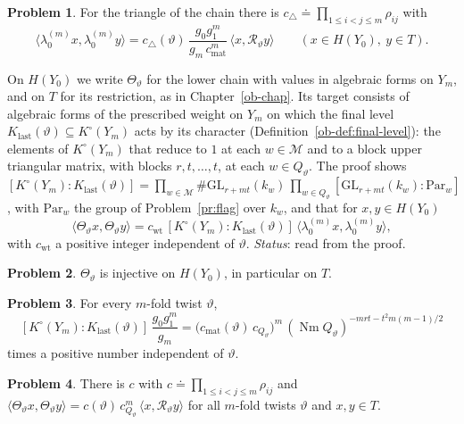 \documentclass[reqno]{amsart}
\newcounter{chap}
\theoremstyle{definition}
\newtheorem{problem}{Problem}[section]
\theoremstyle{plain}
\newcommand{\Nm}{\operatorname{Nm}}
\newcommand{\Rc}{\mathcal R}
\newcommand{\cM}{\mathcal M}
\newcommand{\GL}{\mathrm{GL}}
\newcommand{\cmat}{c_{\mathrm{mat}}}
\newcommand{\cwt}{c_{\mathrm{wt}}}
\newcommand{\Klast}{K_{\mathrm{last}}}
\begin{document}
\begin{problem}\label{pr:chain-row}
For the triangle of the chain there is \(c_\triangle \doteq \prod_{1 \le i < j \le m}\rho_{ij}\) with
\[
  \langle \lambda_0^{(m)}x, \lambda_0^{(m)}y\rangle = c_\triangle(\vartheta)\,\frac{g_0g_1^m}{g_m\,\cmat^m}\,\langle x, \Rc_\vartheta y\rangle \qquad (x \in H(Y_0),\ y \in T).
\]
\end{problem}

On \(H(Y_0)\) we write \(\Theta_\vartheta\) for the lower chain with values in algebraic forms on \(Y_m\), and on \(T\) for its restriction, as in Chapter~\ref{ob-chap}.  Its target consists of algebraic forms of the prescribed weight on \(Y_m\) on which the final level \(\Klast(\vartheta) \subseteq K^\circ(Y_m)\) acts by its character (Definition~\ref{ob-def:final-level}): the elements of \(K^\circ(Y_m)\) that reduce to \(1\) at each \(w \in \cM\) and to a block upper triangular matrix, with blocks \(r, t, \dots, t\), at each \(w \in Q_\vartheta\).  The proof shows
\(
  [K^\circ(Y_m) : \Klast(\vartheta)] = \prod_{w \in \cM}\#\GL_{r+mt}(k_w)\,\prod_{w \in Q_\vartheta}[\GL_{r+mt}(k_w) : \mathrm{Par}_w]
\),
with \(\mathrm{Par}_w\) the group of Problem~\ref{pr:flag} over \(k_w\), and that for \(x, y \in H(Y_0)\)
\[
  \langle \Theta_\vartheta x, \Theta_\vartheta y\rangle = \cwt\,[K^\circ(Y_m) : \Klast(\vartheta)]\,\langle \lambda_0^{(m)}x, \lambda_0^{(m)}y\rangle ,
\]
with \(\cwt\) a positive integer independent of \(\vartheta\).  \emph{Status}: read from the proof.

\begin{problem}\label{pr:theta-injective}
\(\Theta_\vartheta\) is injective on \(H(Y_0)\), in particular on \(T\).
\end{problem}

\begin{problem}\label{pr:last-index}
For every \(m\)-fold twist \(\vartheta\),
\[
  [K^\circ(Y_m) : \Klast(\vartheta)]\,\frac{g_0g_1^m}{g_m} = \bigl(\cmat(\vartheta)\,c_{Q_\vartheta}\bigr)^m\,(\Nm Q_\vartheta)^{-mrt - t^2m(m-1)/2}
\]
times a positive number independent of \(\vartheta\).
\end{problem}

\begin{problem}\label{pr:assemble}
There is \(c\) with \(c \doteq \prod_{1 \le i < j \le m}\rho_{ij}\) and \(\langle \Theta_\vartheta x, \Theta_\vartheta y\rangle = c(\vartheta)\,c_{Q_\vartheta}^m\,\langle x, \Rc_\vartheta y\rangle\) for all \(m\)-fold twists \(\vartheta\) and \(x, y \in T\).
\end{problem}
\end{document}
